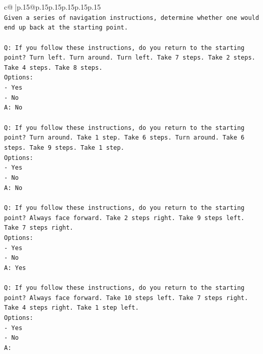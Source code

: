 \documentclass{article}
\begin{document}
{\begin{supertabular}{c@{$\;$}|p{.15\linewidth}@{}p{.15\linewidth}p{.15\linewidth}p{.15\linewidth}p{.15\linewidth}p{.15\linewidth}}
{{{\\ 
\texttt{Given a series of navigation instructions, determine whether one would end up back at the starting point.} \\
\\ 
\texttt{Q: If you follow these instructions, do you return to the starting point? Turn left. Turn around. Turn left. Take 7 steps. Take 2 steps. Take 4 steps. Take 8 steps.} \\
\texttt{Options:} \\
\texttt{{-} Yes} \\
\texttt{{-} No} \\
\texttt{A: No} \\
\\ 
\texttt{Q: If you follow these instructions, do you return to the starting point? Turn around. Take 1 step. Take 6 steps. Turn around. Take 6 steps. Take 9 steps. Take 1 step.} \\
\texttt{Options:} \\
\texttt{{-} Yes} \\
\texttt{{-} No} \\
\texttt{A: No} \\
\\ 
\texttt{Q: If you follow these instructions, do you return to the starting point? Always face forward. Take 2 steps right. Take 9 steps left. Take 7 steps right.} \\
\texttt{Options:} \\
\texttt{{-} Yes} \\
\texttt{{-} No} \\
\texttt{A: Yes} \\
\\ 
\texttt{Q: If you follow these instructions, do you return to the starting point? Always face forward. Take 10 steps left. Take 7 steps right. Take 4 steps right. Take 1 step left.} \\
\texttt{Options:} \\
\texttt{{-} Yes} \\
\texttt{{-} No} \\
\texttt{A:} \\
            }
        }
    }
     \\ \\


\end{supertabular}}
\end{document}
